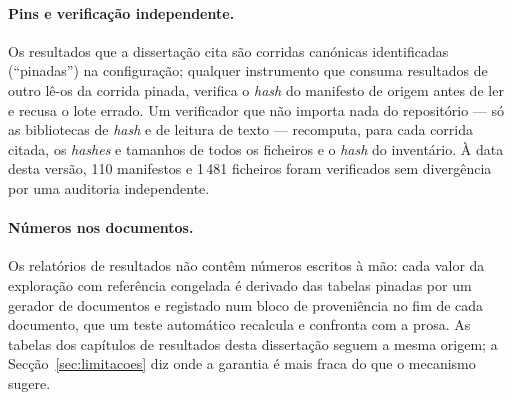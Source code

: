 \paragraph{}

\paragraph{Pins e verificação independente.} Os resultados que a
dissertação cita são corridas canónicas identificadas (``pinadas'') na
configuração; qualquer instrumento que consuma resultados de outro lê-os
da corrida pinada, verifica o \emph{hash} do manifesto de origem antes de
ler e recusa o lote errado. Um verificador que não importa nada do
repositório --- só as bibliotecas de \emph{hash} e de leitura de texto ---
recomputa, para cada corrida citada, os \emph{hashes} e tamanhos de todos
os ficheiros e o \emph{hash} do inventário. À data desta versão, 110
manifestos e 1\,481 ficheiros foram verificados sem divergência por uma
auditoria independente.

\paragraph{Números nos documentos.} Os relatórios de resultados não
contêm números escritos à mão: cada valor da exploração com referência
congelada é derivado das tabelas pinadas por um gerador de documentos e
registado num bloco de proveniência no fim de cada documento, que um teste
automático recalcula e confronta com a prosa. As tabelas dos capítulos de
resultados desta dissertação seguem a mesma origem; a Secção~\ref{sec:limitacoes}
diz onde a garantia é mais fraca do que o mecanismo sugere.

